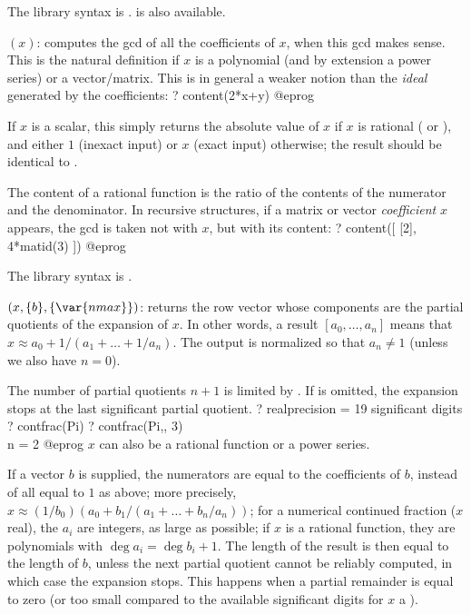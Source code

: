 The library syntax is .
 is also available.

$(x)$: \label{se:content}computes the gcd of all the coefficients of $x$,
when this gcd makes sense. This is the natural definition
if $x$ is a polynomial (and by extension a power series) or a
vector/matrix. This is in general a weaker notion than the \emph{ideal}
generated by the coefficients:
\bprog
? content(2*x+y)
@eprog

If $x$ is a scalar, this simply returns the absolute value of $x$ if $x$ is
rational ( or ), and either $1$ (inexact input) or $x$
(exact input) otherwise; the result should be identical to .

The content of a rational function is the ratio of the contents of the
numerator and the denominator. In recursive structures, if a
matrix or vector \emph{coefficient} $x$ appears, the gcd is taken
not with $x$, but with its content:
\bprog
? content([ [2], 4*matid(3) ])
@eprog

The library syntax is .

$(x,\{b\},\{\var{nmax}\})$: \label{se:contfrac}returns the row vector whose components are the partial quotients of the
 expansion of $x$. In other words, a result
$[a_0,\dots,a_n]$ means that $x \approx a_0+1/(a_1+\dots+1/a_n)$. The
output is normalized so that $a_n \neq 1$ (unless we also have $n = 0$).

The number of partial quotients $n+1$ is limited by . If
 is omitted, the expansion stops at the last significant partial
quotient.
\bprog
? 
  realprecision = 19 significant digits
? contfrac(Pi)
? contfrac(Pi,, 3)  \\ n = 2
@eprog\noindent
$x$ can also be a rational function or a power series.

If a vector $b$ is supplied, the numerators are equal to the coefficients
of $b$, instead of all equal to $1$ as above; more precisely, $x \approx
(1/b_0)(a_0+b_1/(a_1+\dots+b_n/a_n))$; for a numerical continued fraction
($x$ real), the $a_i$ are integers, as large as possible; if $x$ is a
rational function, they are polynomials with $\deg a_i = \deg b_i + 1$.
The length of the result is then equal to the length of $b$, unless the next
partial quotient cannot be reliably computed, in which case the expansion
stops. This happens when a partial remainder is equal to zero (or too small
compared to the available significant digits for $x$ a ).

